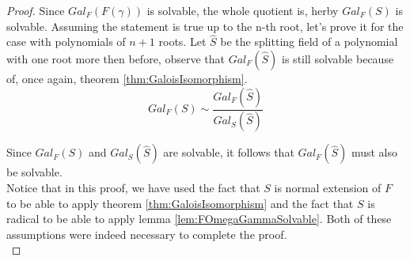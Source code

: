 \begin{proof}
Since $Gal_{F}(F(\gamma))$ is solvable, the whole quotient is, herby $Gal_F(S)$ is solvable. Assuming the 
statement is true up to the n-th root, let's prove it for the case with polynomials of $n+1$ roots. Let 
$\hat{S}$ be the splitting field of a polynomial with one root more then before, observe that 
$Gal_{F}(\hat{S})$ is still solvable because of, once again, theorem \ref{thm:GaloisIsomorphism}. \\

$$ Gal_F(S) \sim \frac{Gal_F(\hat{S})}{Gal_{S}(\hat{S})} $$
\vspace{0.2em}

Since $Gal_F(S)$ and $Gal_{S}(\hat{S})$ are solvable, it follows that $Gal_F(\hat{S})$ must also be 
solvable. \\

Notice that in this proof, we have used the fact that $S$ is normal extension of $F$ to be 
able to apply theorem \ref{thm:GaloisIsomorphism} and the fact that $S$ is radical 
to be able to apply lemma \ref{lem:FOmegaGammaSolvable}. Both of these assumptions were indeed 
necessary to complete the proof. \\
\end{proof}

\newpage